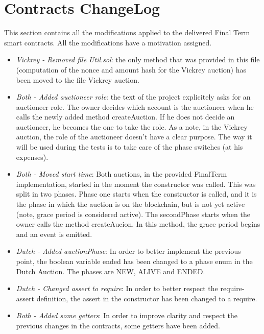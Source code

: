 \documentclass[11pt, a4paper]{report}
\begin{document}
\section*{Contracts ChangeLog}
This section contains all the modifications applied to the delivered Final Term smart contracts. All the modifications have a motivation assigned.
\begin{itemize}
	\item \emph{Vickrey - Removed file Util.sol}: the only method that was provided in this file (computation of the nonce and amount hash for the Vickrey auction) has been moved to the file Vickrey auction. 
	\item \emph{Both - Added auctioneer role}: the text of the project explicitely asks for an auctioneer role. The owner decides which account is the auctioneer when he calls the newly added method createAuction. If he does not decide an auctioneer, he becomes the one to take the role. As a note, in the Vickrey auction, the role of the auctioneer doesn't have a clear purpose. The way it will be used during the tests is to take care of the phase switches (at his expenses).
	\item \emph{Both - Moved start time}: Both auctions, in the provided FinalTerm implementation, started in the moment the constructor was called. This was split in two phases. Phase one starts when the constructor is called, and it is the phase in which the auction is on the blockchain, but is not yet active (note, grace period is considered active). The secondPhase starts when the owner calls the method createAucion. In this method, the grace period begins and an event is emitted.
	\item \emph{Dutch - Added auctionPhase}: In order to better implement the previous point, the boolean variable ended has been changed to a phase enum in the Dutch Auction. The phases are NEW, ALIVE and ENDED.
	\item \emph{Dutch - Changed assert to require}: In order to better respect the require-assert definition, the assert in the constructor has been changed to a require.
	\item \emph{Both - Added some getters}: In order to improve clarity and respect the previous changes in the contracts, some getters have been added.
\end{itemize}
	
	
\end{document}
